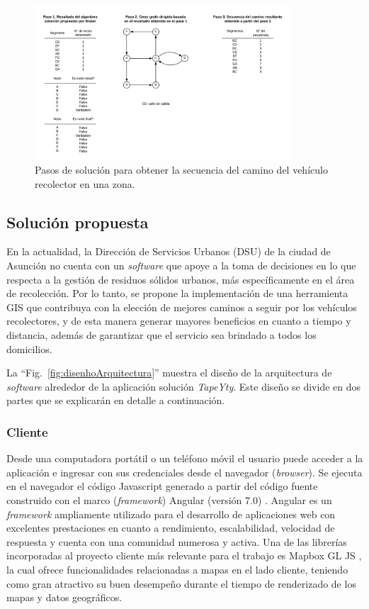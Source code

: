 \documentclass[conference,compsoc]{IEEEtran}
\begin{document}
\begin{figure}[htbp]
\centerline{\includegraphics[width=0.85\textwidth]{imagenes/pasos_de_solucion.png}}
\caption{Pasos de solución para obtener la secuencia del camino del vehículo recolector en una zona.}
\label{fig:PasosSolucion}
\end{figure}

\subsection{Solución propuesta}

En la actualidad, la Dirección de Servicios Urbanos (DSU) de la ciudad de Asunción no cuenta con un \textit{software} que apoye a la toma de decisiones en lo que respecta a la gestión de residuos sólidos urbanos, más específicamente en el área de recolección. Por lo tanto, se propone la implementación de una herramienta GIS que contribuya con la elección de mejores caminos a seguir por los vehículos recolectores, y de esta manera generar mayores beneficios en cuanto a tiempo y distancia, además de garantizar que el servicio sea brindado a todos los domicilios.

La ``Fig.~\ref{fig:disenhoArquitectura}'' muestra el diseño de la arquitectura de \textit{software} alrededor de la aplicación solución \textit{TapeYty}. Este diseño se divide en dos partes que se explicarán en detalle a continuación.

\subsubsection{Cliente}

Desde una computadora portátil o un teléfono móvil el usuario puede acceder a la aplicación e ingresar con sus credenciales desde el navegador (\textit{browser}). Se ejecuta en el navegador el código Javascript generado a partir del código fuente construido con el marco (\textit{framework}) Angular (versión 7.0) \cite{Angular}. Angular es un \textit{framework} ampliamente utilizado para el desarrollo de aplicaciones web con excelentes prestaciones en cuanto a rendimiento, escalabilidad, velocidad de respuesta y cuenta con una comunidad numerosa y activa. Una de las librerías incorporadas al proyecto cliente más relevante para el trabajo es Mapbox GL JS \cite{MapboxJS}, la cual ofrece funcionalidades relacionadas a mapas en el lado cliente, teniendo como gran atractivo su buen desempeño durante el tiempo de renderizado de los mapas y datos geográficos.
\end{document}
